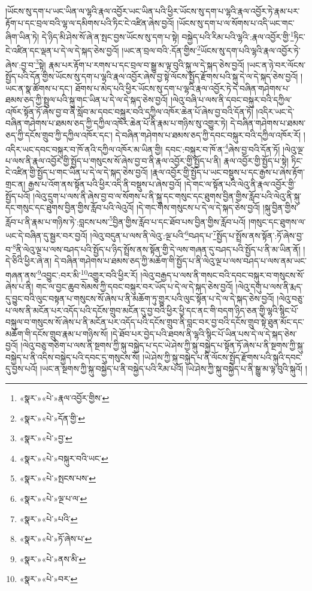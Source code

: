 །ཡོངས་སུ་དག་པ་ཡང་ཡིན་ལ་ལྷའི་རྣལ་འབྱོར་ཡང་ཡིན་པའི་ཕྱིར་ཡོངས་སུ་དག་པ་ལྷའི་རྣལ་འབྱོར་ཏེ་རྣམ་པར་རྟོག་པ་དང་བྲལ་བའི་ལྷ་ལ་དམིགས་པའི་ཏིང་ངེ་འཛིན་ཞེས་བྱའོ། །ཡོངས་སུ་དག་པ་ལ་སོགས་པ་འདི་ཡང་གང་ཞིག་ཡིན་ཏེ། དེ་ཉིད་མི་ཤེས་སོ་ཞེ་ན་སྤང་བྱས་ཡོངས་སུ་དག་པ་སྟེ། བསྐྱེད་པའི་རིམ་པའི་ལྷའི་:རྣལ་འབྱོར་གྱི་\footnote{«སྣར་»«པེ་»རྣལ་འབྱོར་གྱིས་}ཏིང་ངེ་འཛིན་དང་ལྡན་པ་དེ་ལ་དེ་སྐད་ཅེས་བྱའོ། །ཡང་ན་བྲལ་བའི་:དོན་གྱིས་\footnote{«སྣར་»«པེ་»དོན་གྱི་}ཡོངས་སུ་དག་པའི་ལྷའི་རྣལ་འབྱོར་ཏེ་ཞེས་:བྱ་བ་\footnote{«སྣར་»«པེ་»བྱ་}སྟེ། རྣམ་པར་རྟོག་པ་རགས་པ་དང་བྲལ་བ་སྒྱུ་མ་ལྟ་བུའི་སྐུ་ལ་དེ་སྐད་ཅེས་བྱའོ། །ཡང་ན་ཉེ་བར་ལོངས་སྤྱོད་པའི་དོན་གྱིས་ཡོངས་སུ་དག་པ་ལྷའི་རྣལ་འབྱོར་ཞེས་བྱ་སྟེ་ལོངས་སྤྱོད་རྫོགས་པའི་སྐུ་དེ་ལ་དེ་སྐད་ཅེས་བྱའོ། །ཡང་ན་སྣ་ཚོགས་པ་དང་། ཐོགས་པ་མེད་པའི་ཕྱིར་ཡོངས་སུ་དག་པ་ལྷའི་རྣལ་འབྱོར་ཏེ་དེ་བཞིན་གཤེགས་པ་ཐམས་ཅད་ཀྱི་སྤྲུལ་པའི་སྐུ་གང་ཡིན་པ་དེ་ལ་དེ་སྐད་ཅེས་བྱའོ། །ལེའུ་བཞི་པ་ལས་ནི་དབང་བསྐུར་བའི་དཀྱིལ་འཁོར་སྟོན་ཏོ་ཞེས་བྱ་བ་ནི་སློབ་མ་དབང་བསྐུར་བའི་དཀྱིལ་འཁོར་ཆེན་པོ་ཞེས་བྱ་བའི་དོན་ཏོ། །འདིར་ཡང་དེ་བཞིན་གཤེགས་པ་ཐམས་ཅད་ཀྱི་དཀྱིལ་འཁོར་ཆེན་པོ་ནི་རྣམ་པ་གཉིས་སུ་འགྱུར་ཏེ། དེ་བཞིན་གཤེགས་པ་ཐམས་ཅད་ཀྱི་དངོས་གྲུབ་ཀྱི་དཀྱིལ་འཁོར་དང་། དེ་བཞིན་གཤེགས་པ་ཐམས་ཅད་ཀྱི་དབང་བསྐུར་བའི་དཀྱིལ་འཁོར་རོ། །འདིར་ཡང་དབང་བསྐུར་བ་ཁོ་ནའི་དཀྱིལ་འཁོར་མ་ཡིན་གྱི། དབང་:བསྐུར་བ་ཁོ་ན་\footnote{«སྣར་»«པེ་»བསྐུར་བའི་ཡང་}ཞེས་བྱ་བའི་དོན་ཏོ། །ལེའུ་ལྔ་པ་ལས་ནི་རྣལ་འབྱོར་གྱི་སྤྱོད་པ་གསུངས་སོ་ཞེས་བྱ་བ་ནི་རྣལ་འབྱོར་གྱི་སྤྱོད་པ་ནི། རྣལ་འབྱོར་གྱི་སྤྱོད་པ་སྟེ། ཏིང་ངེ་འཛིན་གྱི་སྤྱོད་པ་གང་ཡིན་པ་དེ་ལ་དེ་སྐད་ཅེས་བྱའོ། །རྣལ་འབྱོར་གྱི་སྤྱོད་པ་ཡང་བསྡུས་པ་དང་རྒྱས་པ་ཞེས་རྟོག་གྲང་ན། རྒྱས་པ་འོག་ནས་སྟོན་པའི་ཕྱིར་འདི་ནི་བསྡུས་པ་ཞེས་བྱའོ། །དེ་གང་ལ་སྟོན་པའི་ལེའུ་ནི་རྣལ་འབྱོར་གྱི་སྤྱོད་པའོ། །ལེའུ་དྲུག་པ་ལས་ནི་ཞེས་བྱ་བ་ལ་སོགས་པ་ནི་སྐུ་དང་གསུང་དང་ཐུགས་བྱིན་གྱིས་རློབ་པའི་ལེའུ་ནི་སྐུ་དང་གསུང་དང་ཐུགས་བྱིན་གྱིས་རློབ་པའི་ལེའུའོ། །དེ་གང་གིས་གསུངས་པ་དེ་ལ་དེ་སྐད་ཅེས་བྱའོ། །སྐུ་བྱིན་གྱིས་རློབ་པ་ནི་རྣམ་པ་གཉིས་ཏེ་:བླངས་པས་\footnote{«སྣར་»«པེ་»སྤངས་པས་}བྱིན་གྱིས་རློབ་པ་དང་ཐོབ་པས་བྱིན་གྱིས་རློབ་པའོ། །གསུང་དང་ཐུགས་ལ་ཡང་དེ་བཞིན་དུ་སྦྱར་བར་བྱའོ། །ལེའུ་བདུན་པ་ལས་ནི་ལེའུ་:ལྔ་པའི་\footnote{«སྣར་»«པེ་»ལྔ་པ་ལ་}བཤད་པ་\footnote{«སྣར་»«པེ་»པའི་}སྤྱོད་པ་སྤྲོས་ནས་སྟོན་:ཏོ་ཞེས་བྱ་བ་\footnote{«སྣར་»«པེ་»ཏོ་ཞེས་པ་}ནི་ལེའུ་ལྔ་པ་ལས་བཤད་པའི་སྤྱོད་པ་ཉིད་སྤྲོས་ནས་སྟོན་གྱི་དེ་ལས་གཞན་དུ་བཤད་པའི་སྤྱོད་པ་ནི་མ་ཡིན་ནོ། །དེ་ཅིའི་ཕྱིར་ཞེ་ན། དེ་བཞིན་གཤེགས་པ་ཐམས་ཅད་ཀྱི་མཆོག་གི་སྤྱོད་པ་ནི་ལེའུ་ལྔ་པ་ལས་བཤད་པ་ལས་ནམ་ཡང་གཞན་ནས་\footnote{«སྣར་»«པེ་»ནས་མི་}འབྱུང་:བར་མི་\footnote{«སྣར་»«པེ་»བར་}འགྱུར་བའི་ཕྱིར་རོ། །ལེའུ་བརྒྱད་པ་ལས་ནི་གསང་བའི་དབང་བསྐུར་བ་གསུངས་སོ་ཞེས་པ་ནི། གང་ལ་བྱང་ཆུབ་སེམས་ཀྱི་དབང་བསྐུར་བར་ཡོད་པ་དེ་ལ་དེ་སྐད་ཅེས་བྱའོ། །ལེའུ་དགུ་པ་ལས་ནི་རྨད་དུ་བྱུང་བའི་ལུང་བསྟན་པ་གསུངས་སོ་ཞེས་པ་ནི་མཆོག་ཏུ་གྱུར་པའི་ལུང་སྟོན་པ་དེ་ལ་དེ་སྐད་ཅེས་བྱའོ། །ལེའུ་བཅུ་པ་ལས་ནི་མངོན་པར་འདོད་པའི་དངོས་གྲུབ་མངོན་དུ་བྱ་བའི་ཕྱིར་ཕྱི་དང་ནང་གི་བདག་ཉིད་ཅན་གྱི་ལྷའི་སྙིང་པོ་བསྐུལ་བ་གསུངས་སོ་ཞེས་པ་ནི་མངོན་པར་འདོད་པའི་དངོས་གྲུབ་ནི་བླང་བར་བྱ་བའི་དངོས་གྲུབ་སྟེ་ཐུན་མོང་དང་མཆོག་གི་དངོས་གྲུབ་རྣམ་པ་གཉིས་སོ། །དེ་ཐོབ་པར་བྱེད་པའི་ཐབས་ནི་ལྷའི་སྙིང་པོ་ཡིན་པས་དེ་ལ་དེ་སྐད་ཅེས་བྱའོ། །ལེའུ་བཅུ་གཅིག་པ་ལས་ནི་སྔགས་ཀྱི་སྐུ་བསྐྱེད་པ་དང་ཡེ་ཤེས་ཀྱི་སྐུ་བསྐྱེད་པ་སྟོན་ཏོ་ཞེས་པ་ནི་སྔགས་ཀྱི་སྐུ་བསྐྱེད་པ་ནི་འདིས་བསྐྱེད་པའི་དབང་དུ་གསུངས་སོ། །ཡེ་ཤེས་ཀྱི་སྐུ་བསྐྱེད་པ་ནི་ལོངས་སྤྱོད་རྫོགས་པའི་སྐུའི་དབང་དུ་བྱས་པའོ། །ཡང་ན་སྔགས་ཀྱི་སྐུ་བསྐྱེད་པ་ནི་བསྐྱེད་པའི་རིམ་པའོ། །ཡེ་ཤེས་ཀྱི་སྐུ་བསྐྱེད་པ་ནི་སྒྱུ་མ་ལྟ་བུའི་སྐུའོ། །
